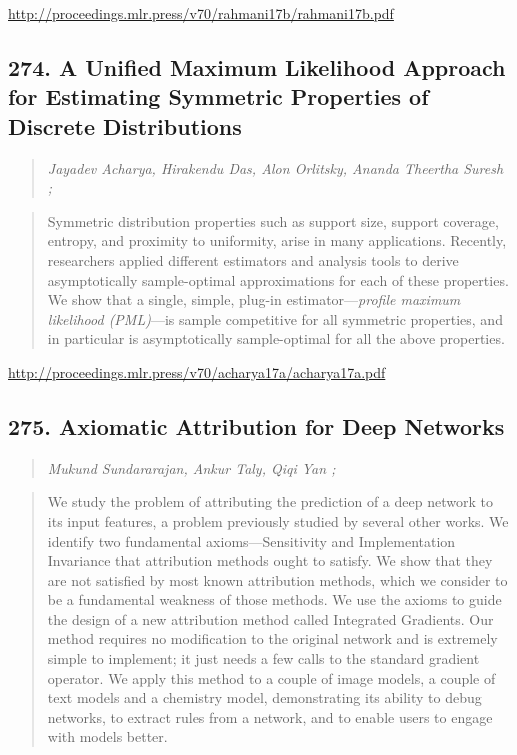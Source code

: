 \documentclass{article}
\begin{document}
\href{http://proceedings.mlr.press/v70/rahmani17b/rahmani17b.pdf}{http://proceedings.mlr.press/v70/rahmani17b/rahmani17b.pdf}

\subsection{274. A Unified Maximum Likelihood Approach for Estimating Symmetric Properties of Discrete Distributions}

\begin{quote}
\footnotesize{\textit{Jayadev Acharya, Hirakendu Das, Alon Orlitsky, Ananda Theertha Suresh ;}}
\end{quote}

\begin{quote}
    Symmetric distribution properties such as support size, support coverage, entropy, and proximity to uniformity, arise in many applications. Recently, researchers applied different estimators and analysis tools to derive asymptotically sample-optimal approximations for each of these properties. We show that a single, simple, plug-in estimator—\textit{profile maximum likelihood (PML)}—is sample competitive for all symmetric properties, and in particular is asymptotically sample-optimal for all the above properties.  \end{quote}

\href{http://proceedings.mlr.press/v70/acharya17a/acharya17a.pdf}{http://proceedings.mlr.press/v70/acharya17a/acharya17a.pdf}

\subsection{275. Axiomatic Attribution for Deep Networks}

\begin{quote}
\footnotesize{\textit{Mukund Sundararajan, Ankur Taly, Qiqi Yan ;}}
\end{quote}

\begin{quote}
    We study the problem of attributing the prediction of a deep network to its input features, a problem previously studied by several other works. We identify two fundamental axioms—Sensitivity and Implementation Invariance that attribution methods ought to satisfy. We show that they are not satisfied by most known attribution methods, which we consider to be a fundamental weakness of those methods. We use the axioms to guide the design of a new attribution method called Integrated Gradients. Our method requires no modification to the original network and is extremely simple to implement; it just needs a few calls to the standard gradient operator. We apply this method to a couple of image models, a couple of text models and a chemistry model, demonstrating its ability to debug networks, to extract rules from a network, and to enable users to engage with models better.  \end{quote}
\end{document}

